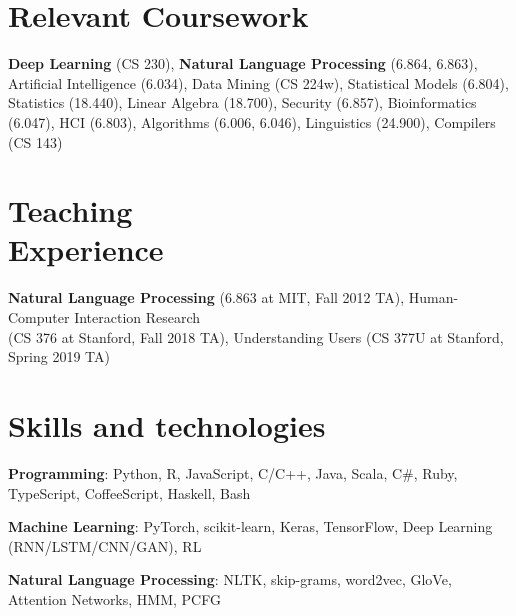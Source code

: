 \documentclass[margin,line]{resume}
\begin{document}
\begin{resume}



\section{\mysidestyle Relevant Coursework}

\textbf{Deep Learning} (CS 230), \textbf{Natural Language Processing} (6.864, 6.863), Artificial Intelligence (6.034), Data Mining (CS 224w), Statistical Models (6.804), Statistics (18.440), Linear Algebra (18.700), Security (6.857), Bioinformatics (6.047), HCI (6.803), Algorithms (6.006, 6.046), Linguistics (24.900), Compilers (CS 143)

\section{\mysidestyle Teaching\\Experience}

\textbf{Natural Language Processing} (6.863 at MIT, Fall 2012 TA), Human-Computer Interaction Research\\
(CS 376 at Stanford, Fall 2018 TA), Understanding Users (CS 377U at Stanford, Spring 2019 TA)

\section{\mysidestyle Skills and technologies}

\textbf{Programming}: Python, R, JavaScript, C/C++, Java, Scala, C\#, Ruby, TypeScript, CoffeeScript, Haskell, Bash

\vspace{-4mm}

\textbf{Machine Learning}: PyTorch, scikit-learn, Keras, TensorFlow, Deep Learning (RNN/LSTM/CNN/GAN), RL %

\vspace{-4mm}

\textbf{Natural Language Processing}: NLTK, skip-grams, word2vec, GloVe, Attention Networks, HMM, PCFG %



\end{resume}
\end{document}
